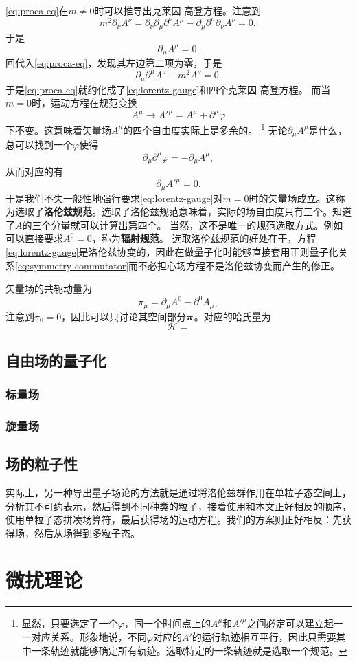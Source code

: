 \documentclass[hyperref, UTF8, a4paper]{ctexart}
\begin{document}
\eqref{eq:proca-eq}在$m \neq 0$时可以推导出克莱因-高登方程。注意到
\[
    m^2 \partial_\nu A^\nu = \partial_\nu \partial_\mu \partial^\nu A^\mu - \partial_\mu \partial^\mu \partial_\nu A^\nu = 0,
\]
于是
\begin{equation}
    \partial_\mu A^\mu = 0.
    \label{eq:lorentz-gauge}
\end{equation}
回代入\eqref{eq:proca-eq}，发现其左边第二项为零，于是
\[
    \partial_\mu \partial^\mu A^\nu + m^2 A^\nu = 0.
\]
于是\eqref{eq:proca-eq}就约化成了\eqref{eq:lorentz-gauge}和四个克莱因-高登方程。
而当$m=0$时，运动方程在规范变换
\begin{equation}
    A^\mu \longrightarrow {A'}^\mu = A^\mu + \partial^\mu \varphi
\end{equation}
下不变。这意味着矢量场$A^\mu$的四个自由度实际上是多余的。%
\footnote{显然，只要选定了一个$\varphi$，同一个时间点上的$A^\mu$和${A'}^\mu$之间必定可以建立起一一对应关系。形象地说，不同$\varphi$对应的$A'$的运行轨迹相互平行，因此只需要其中一条轨迹就能够确定所有轨迹。选取特定的一条轨迹就是选取一个规范。}%
无论$\partial_\mu A^\mu$是什么，总可以找到一个$\varphi$使得
\[
    \partial_\mu \partial^\mu \varphi = - \partial_\mu A^\mu,
\]
从而对应的有
\[
    \partial_\mu {A'}^\mu = 0.
\]
于是我们不失一般性地强行要求\eqref{eq:lorentz-gauge}对$m=0$时的矢量场成立。这称为选取了\textbf{洛伦兹规范}。选取了洛伦兹规范意味着，实际的场自由度只有三个。知道了$A$的三个分量就可以计算出第四个。
当然，这不是唯一的规范选取方式。例如可以直接要求$A^0 = 0$，称为\textbf{辐射规范}。
选取洛伦兹规范的好处在于，方程\eqref{eq:lorentz-gauge}是洛伦兹协变的，因此在做量子化时能够直接套用正则量子化关系\eqref{eq:symmetry-commutator}而不必担心场方程不是洛伦兹协变而产生的修正。

矢量场的共轭动量为
\begin{equation}
    \pi_\mu = \partial_\mu A^0 - \partial^0 A_\mu,
\end{equation}
注意到$\pi_0 = 0$，因此可以只讨论其空间部分$\vb*{\pi}$。对应的哈氏量为
\begin{equation}
    \mathcal{H} = 
\end{equation}

\subsection{自由场的量子化}

\subsubsection{标量场}


\subsubsection{旋量场}

\subsection{场的粒子性}\label{sec:field-as-particles}

实际上，另一种导出量子场论的方法就是通过将洛伦兹群作用在单粒子态空间上，分析其不可约表示，然后得到不同种类的粒子，接着使用和本文正好相反的顺序，使用单粒子态拼凑场算符，最后获得场的运动方程。我们的方案则正好相反：先获得场，然后从场得到多粒子态。

\section{微扰理论}

\end{document}
